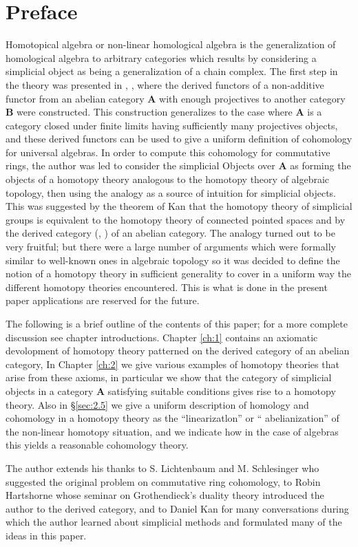\documentclass[../main]{subfiles}
\begin{document}
\chapter*{Preface}

Homotopical algebra or non-linear homological algebra is the
generalization of homological algebra to arbitrary categories
which results by considering a simplicial object as being a generalization of a chain complex. The first step in the theory was presented in \cite{dold_homology_1958}, \cite{dold_homologie_1961}, where the derived functors of a non-additive functor from an abelian category $\mathbf{A}$ with enough projectives to another category $\mathbf{B}$ were constructed. This construction generalizes to the case where $\mathbf{A}$ is a category closed under finite limits having sufficiently many projectives objects, and these derived functors can be used to give a uniform definition of cohomology for universal algebras. In order to compute this cohomology for commutative rings, the author was led to consider the
simplicial Objects over $\mathbf{A}$ as forming the objects of a homotopy
theory analogous to the homotopy theory of algebraic topology,
then using the analogy as a source of intuition for simplicial
objects. This was suggested by the theorem of Kan \cite{kan_homotopy_1958} that the
homotopy theory of simplicial groups is equivalent to the homotopy theory of connected pointed spaces and by the derived category (\cite{hartshorne_residues_1966}, \cite{verdier_categories_nodate}) of an abelian category. The analogy turned out
to be very fruitful; but there were a large number of arguments which were formally similar to well-known ones in algebraic topology so it was decided to define the notion of a homotopy theory
in sufficient generality to cover in a uniform way the different
homotopy theories encountered. This is what is done in the present paper applications are reserved for the future. 

The following is a brief outline of the contents of this paper; for a more complete discussion see chapter introductions. Chapter \ref{ch:1} contains an axiomatic devolopment of homotopy theory patterned on the derived category of an abelian category, In Chapter \ref{ch:2} we
give various examples of homotopy theories that arise from these
axioms, in particular we show that the category of simplicial objects in a category $\mathbf{A}$ satisfying suitable conditions gives rise
to a homotopy theory. Also in \S\ref{sec:2.5} we give a uniform description
of homology and cohomology in a homotopy theory as the ``linearizatlon'' or `` abelianization'' of the non-linear homotopy situation,
and we indicate how in the case of algebras this yields a reasonable cohomology theory.

The author extends his thanks to S. Lichtenbaum and
M. Schlesinger who suggested the original problem on commutative
ring cohomology, to Robin Hartshorne whose seminar \cite{hartshorne_residues_1966} on
Grothendieck's duality theory introduced the author to the derived
category, and to Daniel Kan for many conversations during which
the author learned about simplicial methods and formulated many
of the ideas in this paper.
\end{document}

